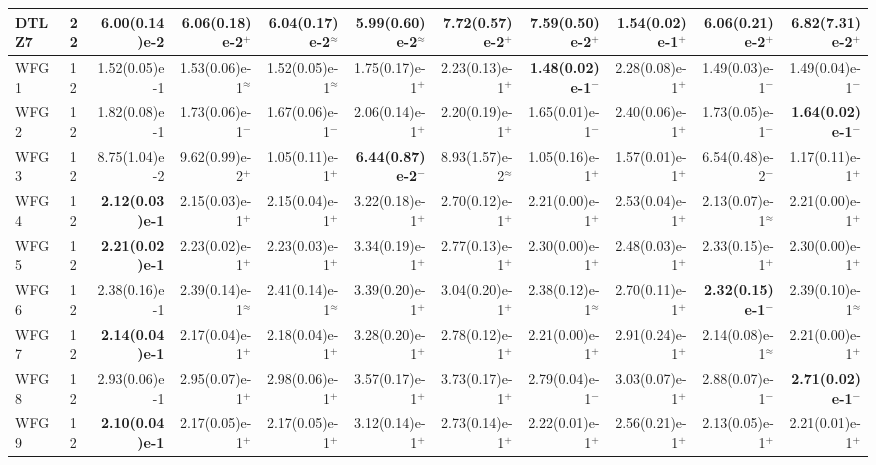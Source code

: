 \begin{longtable}{llrrrrrrrrr}
DTLZ7 & 22 & 6.00(0.14)e-2 & 6.06(0.18)e-2$^{+}$ & 6.04(0.17)e-2$^{\approx}$ & \textbf{5.99(0.60)e-2}$^{\approx}$ & 7.72(0.57)e-2$^{+}$ & 7.59(0.50)e-2$^{+}$ & 1.54(0.02)e-1$^{+}$ & 6.06(0.21)e-2$^{+}$ & 6.82(7.31)e-2$^{+}$ \\
\midrule
WFG1 & 12 & 1.52(0.05)e-1 & 1.53(0.06)e-1$^{\approx}$ & 1.52(0.05)e-1$^{\approx}$ & 1.75(0.17)e-1$^{+}$ & 2.23(0.13)e-1$^{+}$ & \textbf{1.48(0.02)e-1}$^{-}$ & 2.28(0.08)e-1$^{+}$ & 1.49(0.03)e-1$^{-}$ & 1.49(0.04)e-1$^{-}$ \\
WFG2 & 12 & 1.82(0.08)e-1 & 1.73(0.06)e-1$^{-}$ & 1.67(0.06)e-1$^{-}$ & 2.06(0.14)e-1$^{+}$ & 2.20(0.19)e-1$^{+}$ & 1.65(0.01)e-1$^{-}$ & 2.40(0.06)e-1$^{+}$ & 1.73(0.05)e-1$^{-}$ & \textbf{1.64(0.02)e-1}$^{-}$ \\
WFG3 & 12 & 8.75(1.04)e-2 & 9.62(0.99)e-2$^{+}$ & 1.05(0.11)e-1$^{+}$ & \textbf{6.44(0.87)e-2}$^{-}$ & 8.93(1.57)e-2$^{\approx}$ & 1.05(0.16)e-1$^{+}$ & 1.57(0.01)e-1$^{+}$ & 6.54(0.48)e-2$^{-}$ & 1.17(0.11)e-1$^{+}$ \\
WFG4 & 12 & \textbf{2.12(0.03)e-1} & 2.15(0.03)e-1$^{+}$ & 2.15(0.04)e-1$^{+}$ & 3.22(0.18)e-1$^{+}$ & 2.70(0.12)e-1$^{+}$ & 2.21(0.00)e-1$^{+}$ & 2.53(0.04)e-1$^{+}$ & 2.13(0.07)e-1$^{\approx}$ & 2.21(0.00)e-1$^{+}$ \\
WFG5 & 12 & \textbf{2.21(0.02)e-1} & 2.23(0.02)e-1$^{+}$ & 2.23(0.03)e-1$^{+}$ & 3.34(0.19)e-1$^{+}$ & 2.77(0.13)e-1$^{+}$ & 2.30(0.00)e-1$^{+}$ & 2.48(0.03)e-1$^{+}$ & 2.33(0.15)e-1$^{+}$ & 2.30(0.00)e-1$^{+}$ \\
WFG6 & 12 & 2.38(0.16)e-1 & 2.39(0.14)e-1$^{\approx}$ & 2.41(0.14)e-1$^{\approx}$ & 3.39(0.20)e-1$^{+}$ & 3.04(0.20)e-1$^{+}$ & 2.38(0.12)e-1$^{\approx}$ & 2.70(0.11)e-1$^{+}$ & \textbf{2.32(0.15)e-1}$^{-}$ & 2.39(0.10)e-1$^{\approx}$ \\
WFG7 & 12 & \textbf{2.14(0.04)e-1} & 2.17(0.04)e-1$^{+}$ & 2.18(0.04)e-1$^{+}$ & 3.28(0.20)e-1$^{+}$ & 2.78(0.12)e-1$^{+}$ & 2.21(0.00)e-1$^{+}$ & 2.91(0.24)e-1$^{+}$ & 2.14(0.08)e-1$^{\approx}$ & 2.21(0.00)e-1$^{+}$ \\
WFG8 & 12 & 2.93(0.06)e-1 & 2.95(0.07)e-1$^{+}$ & 2.98(0.06)e-1$^{+}$ & 3.57(0.17)e-1$^{+}$ & 3.73(0.17)e-1$^{+}$ & 2.79(0.04)e-1$^{-}$ & 3.03(0.07)e-1$^{+}$ & 2.88(0.07)e-1$^{-}$ & \textbf{2.71(0.02)e-1}$^{-}$ \\
WFG9 & 12 & \textbf{2.10(0.04)e-1} & 2.17(0.05)e-1$^{+}$ & 2.17(0.05)e-1$^{+}$ & 3.12(0.14)e-1$^{+}$ & 2.73(0.14)e-1$^{+}$ & 2.22(0.01)e-1$^{+}$ & 2.56(0.21)e-1$^{+}$ & 2.13(0.05)e-1$^{+}$ & 2.21(0.01)e-1$^{+}$ \\

\end{longtable}
